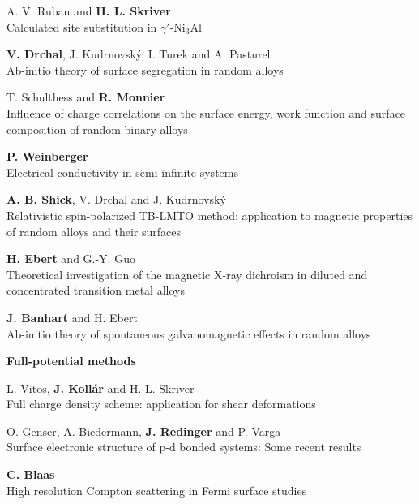 {\vskip1mm

 A. V. Ruban and {\bf H. L. Skriver}\\
                Calculated site substitution in $\gamma'$-Ni$_3$Al

 {\bf V. Drchal}, J. Kudrnovsk\'y, I. Turek and
                 A. Pasturel \\
                Ab-initio theory of surface segregation in random
                 alloys

  T. Schulthess and {\bf R. Monnier} \\
                Influence of charge correlations on the surface energy,
                work
                 function and surface composition of random binary
                 alloys

{\bf P. Weinberger}\\
                Electrical conductivity in semi-infinite systems

{\bf A. B. Shick}, V. Drchal and J. Kudrnovsk\'y \\
                Relativistic spin-polarized TB-LMTO method: application
                 to
                 magnetic
                properties
                 of random alloys and their
                 surfaces

 {\bf H. Ebert} and G.-Y. Guo \\
                Theoretical investigation of the magnetic X-ray
                dichroism in
                 diluted
                 and concentrated transition
                metal alloys

 {\bf J. Banhart} and H. Ebert \\
                Ab-initio theory of spontaneous galvanomagnetic
                 effects in
                 random
                 alloys

\vskip4mm

{\Large{\bf Full-potential methods }}

\vskip1mm

 L. Vitos, {\bf J. Koll\'ar}
 and H. L. Skriver \\
                Full charge density scheme:
                 application for shear deformations

 O. Genser, A. Biedermann, {\bf J. Redinger} and P.
Varga \\
                Surface electronic structure of p-d bonded systems:
                Some recent results

{\bf C. Blaas}\\
                High resolution Compton scattering in Fermi surface
                 studies

}
